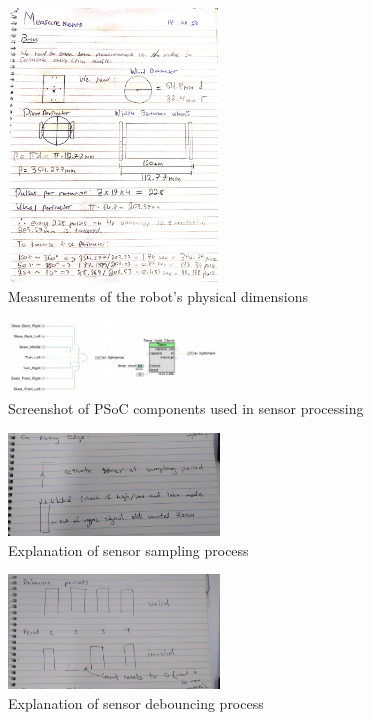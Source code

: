 \documentclass[conference]{IEEEtran}
\begin{document}
\begin{figure}[htbp]
	\centerline{\includegraphics[width=0.5\textwidth]{physical-measurements.png}}
	\caption{Measurements of the robot's physical dimensions}
	\label{fig:physical-dimensions}
\end{figure}

\begin{figure}[htbp]
	\centerline{\includegraphics[width=0.5\textwidth]{sensor-psoc.png}}
	\caption{Screenshot of PSoC components used in sensor processing}
	\label{fig:sensor-psoc}
\end{figure}

\begin{figure}[htbp]
	\centerline{\includegraphics[width=0.5\textwidth]{sensor-sampling.png}}
	\caption{Explanation of sensor sampling process}
	\label{fig:sensor-sampling}
\end{figure}

\begin{figure}[htbp]
	\centerline{\includegraphics[width=0.5\textwidth]{sensor-debouncing.png}}
	\caption{Explanation of sensor debouncing process}
	\label{fig:sensor-debouncing}
\end{figure}
\end{document}
